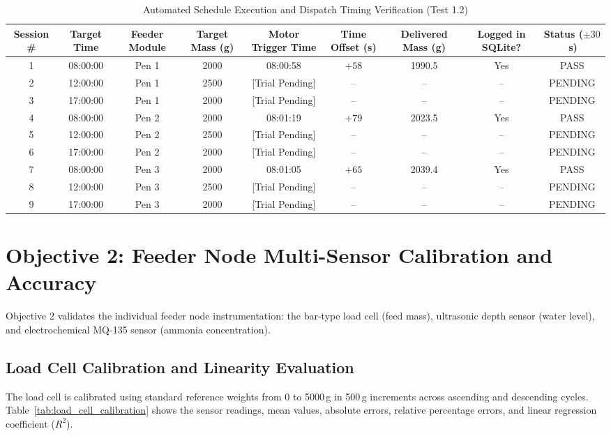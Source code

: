 \begin{table}[htbp!]
\centering
\caption{Automated Schedule Execution and Dispatch Timing Verification (Test 1.2)}
\label{tab:schedule_execution}
\begin{adjustbox}{width=\textwidth}
\begin{tabular}{ccccccccc}
\toprule
\textbf{Session \#} & \textbf{Target Time} & \textbf{Feeder Module} & \textbf{Target Mass (g)} & \textbf{Motor Trigger Time} & \textbf{Time Offset (s)} & \textbf{Delivered Mass (g)} & \textbf{Logged in SQLite?} & \textbf{Status ($\pm 30$\,s)} \\
\midrule
1 & 08:00:00 & Pen 1 & 2000 & 08:00:58 & $+58$ & 1990.5 & Yes & PASS \\
2 & 12:00:00 & Pen 1 & 2500 & [Trial Pending] & -- & -- & -- & PENDING \\
3 & 17:00:00 & Pen 1 & 2000 & [Trial Pending] & -- & -- & -- & PENDING \\
4 & 08:00:00 & Pen 2 & 2000 & 08:01:19 & $+79$ & 2023.5 & Yes & PASS \\
5 & 12:00:00 & Pen 2 & 2500 & [Trial Pending] & -- & -- & -- & PENDING \\
6 & 17:00:00 & Pen 2 & 2000 & [Trial Pending] & -- & -- & -- & PENDING \\
7 & 08:00:00 & Pen 3 & 2000 & 08:01:05 & $+65$ & 2039.4 & Yes & PASS \\
8 & 12:00:00 & Pen 3 & 2500 & [Trial Pending] & -- & -- & -- & PENDING \\
9 & 17:00:00 & Pen 3 & 2000 & [Trial Pending] & -- & -- & -- & PENDING \\
\bottomrule
\end{tabular}
\end{adjustbox}
\end{table}

\section{Objective 2: Feeder Node Multi-Sensor Calibration and Accuracy}
\label{sec:results_obj2}

Objective 2 validates the individual feeder node instrumentation: the bar-type load cell (feed mass), ultrasonic depth sensor (water level), and electrochemical MQ-135 sensor (ammonia concentration).

\subsection{Load Cell Calibration and Linearity Evaluation}
The load cell is calibrated using standard reference weights from 0 to 5000\,g in 500\,g increments across ascending and descending cycles. Table~\ref{tab:load_cell_calibration} shows the sensor readings, mean values, absolute errors, relative percentage errors, and linear regression coefficient ($R^2$).

